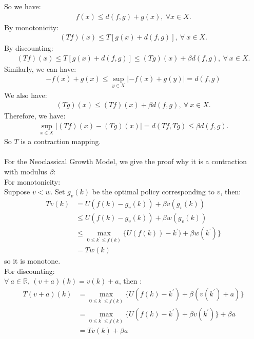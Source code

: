 \documentclass{article}
\begin{document}
\indent So we have:
\begin{align*}
	f(x) \leq d(f, g) + g(x),\ \forall x \in X.
\end{align*}
\indent By monotonicity:
\begin{align*}
	(Tf)(x) \leq T[g(x) + d(f, g)],\ \forall\ x \in X.
\end{align*}
\indent By discounting:
\begin{align*}
	(Tf)(x) \leq T[g(x) + d(f, g)] \leq (Tg)(x) + \beta d(f, g),\ \forall\ x \in X.
\end{align*}
\indent Similarly, we can have:
\begin{align*}
	-f(x) + g(x) \leq \mathop{sup}\limits_{y \in X} |-f(x) + g(y)| = d(f, g)
\end{align*}
\indent We also have:
\begin{align*}
	(Tg)(x) \leq (Tf)(x) + \beta d(f, g),\ \forall\ x \in X.
\end{align*}
\indent Therefore, we have:
\begin{align*}
	\mathop{sup}\limits_{x \in X} |(Tf)(x) - (Tg)(x)| = d(Tf, Tg) \leq \beta d(f, g).
\end{align*}
\indent So $T$ is a contraction mapping.\\\\
For the Neoclassical Growth Model, we give the proof why it is a contraction with modulus $\beta$:\\
\indent For monotonicity:\\
\indent\indent Suppose $v < w$. Set $g_v(k)$ be the optimal policy corresponding to $v$, then:
\begin{align*}
	Tv(k) &= U(f(k) - g_v(k)) + \beta v(g_v(k))\\
	&\leq U(f(k) - g_v(k)) + \beta w(g_v(k))\\
	&\leq \mathop{max}\limits_{0 \leq k^\prime \leq f(k)} \{U(f(k)) - k^\prime) + \beta w(k^\prime)\}\\
	&= Tw(k)
\end{align*}
\indent\indent so it is monotone.\\
\indent For discounting:\\
\indent\indent $\forall\ a \in \mathbb{R}$, $(v + a)(k) = v(k) + a$, then :\\
\begin{align*}
	T(v + a)(k) &= \mathop{max}\limits_{0 \leq k^\prime \leq f(k)} \{U(f(k) - k^\prime) + \beta (v(k^\prime) + a)\}\\
	&= \mathop{max}\limits_{0 \leq k^\prime \leq f(k)} \{U(f(k) - k^\prime) + \beta v(k^\prime)\} + \beta a\\
	&= Tv(k) + \beta a
\end{align*}
\end{document}
